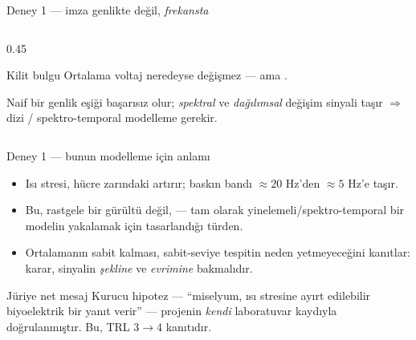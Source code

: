 \documentclass[aspectratio=169,11pt]{beamer}
\begin{document}
\begin{frame}{Deney 1 — imza genlikte değil, \emph{frekansta}}
  \begin{columns}[T]
    \begin{column}{0.45\textwidth}
      \begin{block}{Kilit bulgu}
        Ortalama voltaj neredeyse değişmez — ama .
      \end{block}
      Naif bir genlik eşiği başarısız olur; \emph{spektral} ve \emph{dağılımsal}
      değişim sinyali taşır $\Rightarrow$ dizi / spektro-temporal modelleme gerekir.
    \end{column}
  \end{columns}
\end{frame}

\begin{frame}{Deney 1 — bunun modelleme için anlamı}
  \begin{itemize}
    \item Isı stresi, hücre zarındaki  artırır;
      baskın bandı $\approx20$ Hz'den $\approx5$ Hz'e taşır.
    \item Bu, rastgele bir gürültü değil,  — tam olarak yinelemeli/spektro-temporal bir modelin yakalamak için
      tasarlandığı türden.
    \item Ortalamanın sabit kalması, \alert{sabit-seviye tespitin neden
      yetmeyeceğini} kanıtlar: karar, sinyalin \emph{şekline} ve \emph{evrimine}
      bakmalıdır.
  \end{itemize}
  \begin{block}{Jüriye net mesaj}
    Kurucu hipotez — ``miselyum, ısı stresine ayırt edilebilir biyoelektrik bir
    yanıt verir'' — projenin \emph{kendi} laboratuvar kaydıyla doğrulanmıştır. Bu,
    TRL 3$\to$4 kanıtıdır.
  \end{block}
\end{frame}
\end{document}
